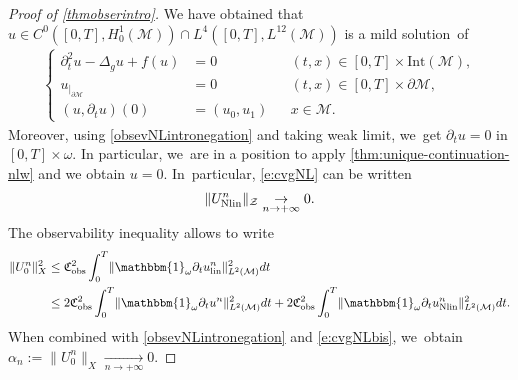 \documentclass[10pt]{amsart}
\newcommand{\lin}{\textup{lin}}
\newcommand{\Nlin}{\textup{Nlin}}
\theoremstyle{definition}
\let\mc\mathcal
\newcommand{\M}{\mc{M}}
\providecommand{\norm}[1]{\lVert#1\rVert}
\begin{document}
\begin{proof}[Proof of \cref{thmobserintro}]
We have obtained that $u\in C^{0}([0, T],H_0^1(\M))\cap L^{4}([0, T],L^{12}(\M))$ is a mild solution~of
\begin{align*}
\left\{\begin{aligned}
\partial_t^2 u-\Delta_g u+f(u)&=0 &&(t, x)\in [0, T]\times \text{Int}(\M),\\
u_{|_{\partial\M}}&=0 &&(t, x)\in [0, T]\times\partial\M,\\
(u, \partial_t u)(0)&=(u_0, u_1)&&x\in \M .
\end{aligned}\right.
\end{align*}
Moreover, using \eqref{obsevNLintronegation} and taking weak limit, we~get $\partial_t u=0$ in $[0, T]\times\omega$.
In particular, we~are in a position to apply \cref{thm:unique-continuation-nlw} and we obtain $u=0$. In~particular, \eqref{e:cvgNL} can be written
\begin{align}
\label{e:cvgNLbis}
\norm{U_{\Nlin}^n}_{\mc{Z}}\underset{n\to +\infty}{\to}0.
\end{align}
The observability inequality allows to write
\begin{align*}
\norm{U_0^n}_{X}^2 &\leq \mathfrak{C}_{\textup{obs}}^2\int_0^T \norm{\mathbbm{1}_\omega\partial_t u_{\lin}^n}_{L^2(\M)}^2dt\\
&\leq 2\mathfrak{C}_{\textup{obs}}^2\int_0^T \norm{\mathbbm{1}_\omega\partial_t u^n}_{L^2(\M)}^2dt+2\mathfrak{C}_{\textup{obs}}^2\int_0^T \norm{\mathbbm{1}_\omega\partial_t u_{\Nlin}^n}_{L^2(\M)}^2dt.
\end{align*}
When combined with \eqref{obsevNLintronegation} and \eqref{e:cvgNLbis}, we~obtain $\alpha_n:=\norm{U_0^n}_{X}\underset{n\to +\infty}{\to}0$.


\end{proof}
\end{document}
